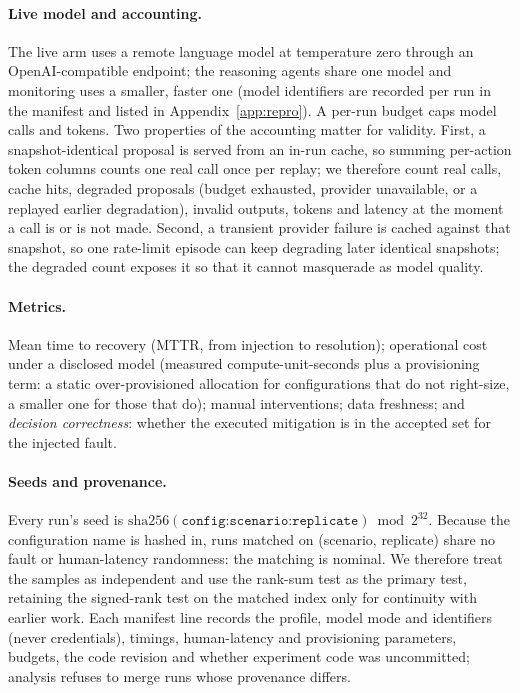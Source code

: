\paragraph{Live model and accounting.}
The live arm uses a remote language model at temperature zero through an OpenAI-compatible endpoint;
the reasoning agents share one model and monitoring uses a smaller, faster one (model identifiers are
recorded per run in the manifest and listed in Appendix~\ref{app:repro}). A per-run budget caps model
calls and tokens. Two properties of the accounting matter for validity. First, a snapshot-identical
proposal is served from an in-run cache, so summing per-action token columns counts one real call
once per replay; we therefore count real calls, cache hits, degraded proposals (budget exhausted,
provider unavailable, or a replayed earlier degradation), invalid outputs, tokens and latency at the
moment a call is or is not made. Second, a transient provider failure is cached against that
snapshot, so one rate-limit episode can keep degrading later identical snapshots; the degraded count
exposes it so that it cannot masquerade as model quality.

\paragraph{Metrics.}
Mean time to recovery (MTTR, from injection to resolution); operational cost under a disclosed
model (measured compute-unit-seconds plus a provisioning term: a static over-provisioned allocation
for configurations that do not right-size, a smaller one for those that do); manual interventions;
data freshness; and \emph{decision correctness}: whether the executed mitigation is in the accepted
set for the injected fault.

\paragraph{Seeds and provenance.}
Every run's seed is $\mathrm{sha256}(\texttt{config:scenario:replicate}) \bmod 2^{32}$. Because the
configuration name is hashed in, runs matched on (scenario, replicate) share no fault or
human-latency randomness: the matching is nominal. We therefore treat the samples as independent and
use the rank-sum test as the primary test, retaining the signed-rank test on the matched index only
for continuity with earlier work. Each manifest line records the profile, model mode and identifiers
(never credentials), timings, human-latency and provisioning parameters, budgets, the code revision
and whether experiment code was uncommitted; analysis refuses to merge runs whose provenance
differs.

